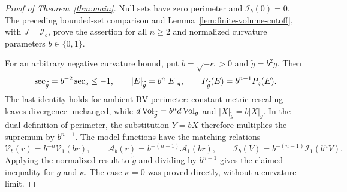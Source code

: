 \begin{proof}[Proof of Theorem~\ref{thm:main}]
Null sets have zero perimeter and $\mathcal I_b(0)=0$.
The preceding bounded-set comparison and
Lemma~\ref{lem:finite-volume-cutoff}, with $J=\mathcal I_b$, prove the
assertion for all $n\ge2$ and normalized curvature parameters
$b\in\{0,1\}$.

For an arbitrary negative curvature bound, put $b=\sqrt{-\kappa}>0$
and $\widetilde g=b^2g$. Then
\[
 \operatorname{sec}_{\widetilde g}=b^{-2}\operatorname{sec}_g\le-1,
 \qquad |E|_{\widetilde g}=b^n|E|_g,
 \qquad P_{\widetilde g}(E)=b^{n-1}P_g(E).
\]
The last identity holds for ambient BV perimeter: constant metric
rescaling leaves divergence unchanged, while
$d\operatorname{Vol}_{\widetilde g}=b^n d\operatorname{Vol}_g$ and $|X|_{\widetilde g}=b|X|_g$.
In the dual definition of perimeter, the substitution $Y=bX$ therefore
multiplies the supremum by $b^{n-1}$.
The model functions have the matching relations
\[
 \mathcal V_b(r)=b^{-n}\mathcal V_1(br),\qquad
 \mathcal A_b(r)=b^{-(n-1)}\mathcal A_1(br),\qquad
 \mathcal I_b(V)=b^{-(n-1)}\mathcal I_1(b^nV).
\]
Applying the normalized result to $\widetilde g$ and dividing by
$b^{n-1}$ gives the claimed inequality for $g$ and $\kappa$.
The case $\kappa=0$ was proved directly, without a curvature limit.
\end{proof}
